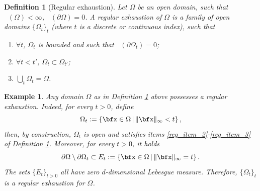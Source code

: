 \documentclass{amsart}
\newtheorem{defn}[thm]{Definition}
\newtheorem{exmp}[thm]{Example}
\DeclareMathOperator{\Ld}{\mathcal{L}^d}
\begin{document}
\begin{defn}[Regular exhaustion]\label{reg_exhaustion}
    Let $\Omega$ be an open domain, such that $\Ld(\Omega)<\infty$, $\Ld(\partial\Omega)=0$. A regular exhaustion of $\Omega$ is a family of open domains $\{\Omega_t\}_t$ (where $t$ is a discrete or continuous index), such that
    \begin{enumerate}
    \item\label{reg_item_1} $\forall t$, $\Omega_t$ is bounded and such that $\Ld(\partial\Omega_t)=0$;
    \item\label{reg_item_2} $\forall t<t'$, $\Omega_t\subset\Omega_{t'}$;
    \item\label{reg_item_3} $\bigcup_t\Omega_t=\Omega$.
    \end{enumerate}

\end{defn}
\begin{exmp}\label{exmp:reg_exhaustion}
    Any domain $\Omega$ as in Definition \ref{reg_exhaustion} above possesses a regular exhaustion. 
    Indeed, for every $t>0$, define
    \begin{equation*}
        \Omega_t:=\left\{\bfx\in\Omega\,\vert\,\|\bfx\|_\infty<t\right\},
    \end{equation*}
then, by construction, $\Omega_t$ is open and satisfies items \eqref{reg_item_2}-\eqref{reg_item_3} of Definition \ref{reg_exhaustion}. Moreover, for every $t>0$, it holds 
\begin{equation*}
    \partial\Omega\setminus\partial\Omega_t\subset E_t:=\left\{\bfx\in\Omega\,\vert\,\|\bfx\|_\infty=t\right\}.
\end{equation*}
The sets $\{E_t\}_{t>0}$ all have zero $d$-dimensional Lebesgue measure. 
Therefore, $\{\Omega_{t}\}_t$ is a regular exhaustion for $\Omega$. 
\end{exmp}
\end{document}
